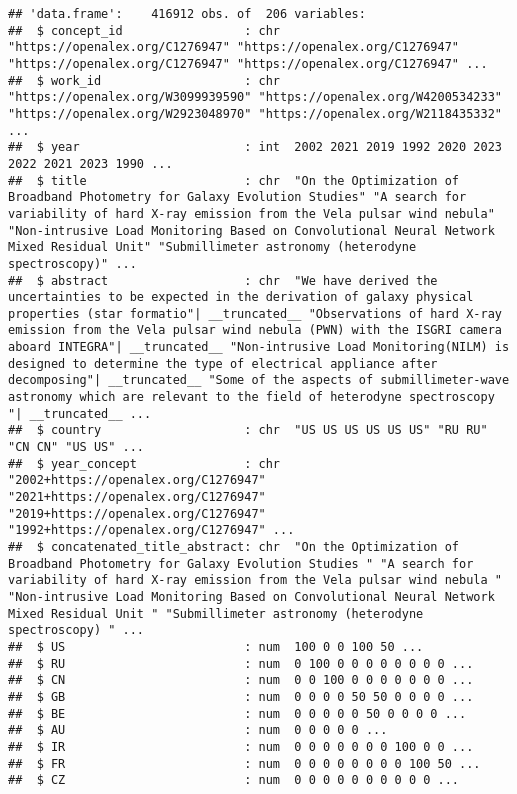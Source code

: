 \documentclass[
]{article}
\begin{document}
\begin{verbatim}
## 'data.frame':    416912 obs. of  206 variables:
##  $ concept_id                 : chr  "https://openalex.org/C1276947" "https://openalex.org/C1276947" "https://openalex.org/C1276947" "https://openalex.org/C1276947" ...
##  $ work_id                    : chr  "https://openalex.org/W3099939590" "https://openalex.org/W4200534233" "https://openalex.org/W2923048970" "https://openalex.org/W2118435332" ...
##  $ year                       : int  2002 2021 2019 1992 2020 2023 2022 2021 2023 1990 ...
##  $ title                      : chr  "On the Optimization of Broadband Photometry for Galaxy Evolution Studies" "A search for variability of hard X-ray emission from the Vela pulsar wind nebula" "Non-intrusive Load Monitoring Based on Convolutional Neural Network Mixed Residual Unit" "Submillimeter astronomy (heterodyne spectroscopy)" ...
##  $ abstract                   : chr  "We have derived the uncertainties to be expected in the derivation of galaxy physical properties (star formatio"| __truncated__ "Observations of hard X-ray emission from the Vela pulsar wind nebula (PWN) with the ISGRI camera aboard INTEGRA"| __truncated__ "Non-intrusive Load Monitoring(NILM) is designed to determine the type of electrical appliance after decomposing"| __truncated__ "Some of the aspects of submillimeter-wave astronomy which are relevant to the field of heterodyne spectroscopy "| __truncated__ ...
##  $ country                    : chr  "US US US US US US" "RU RU" "CN CN" "US US" ...
##  $ year_concept               : chr  "2002+https://openalex.org/C1276947" "2021+https://openalex.org/C1276947" "2019+https://openalex.org/C1276947" "1992+https://openalex.org/C1276947" ...
##  $ concatenated_title_abstract: chr  "On the Optimization of Broadband Photometry for Galaxy Evolution Studies " "A search for variability of hard X-ray emission from the Vela pulsar wind nebula " "Non-intrusive Load Monitoring Based on Convolutional Neural Network Mixed Residual Unit " "Submillimeter astronomy (heterodyne spectroscopy) " ...
##  $ US                         : num  100 0 0 100 50 ...
##  $ RU                         : num  0 100 0 0 0 0 0 0 0 0 ...
##  $ CN                         : num  0 0 100 0 0 0 0 0 0 0 ...
##  $ GB                         : num  0 0 0 0 50 50 0 0 0 0 ...
##  $ BE                         : num  0 0 0 0 0 50 0 0 0 0 ...
##  $ AU                         : num  0 0 0 0 0 ...
##  $ IR                         : num  0 0 0 0 0 0 0 100 0 0 ...
##  $ FR                         : num  0 0 0 0 0 0 0 0 100 50 ...
##  $ CZ                         : num  0 0 0 0 0 0 0 0 0 0 ...

\end{verbatim}
\end{document}
